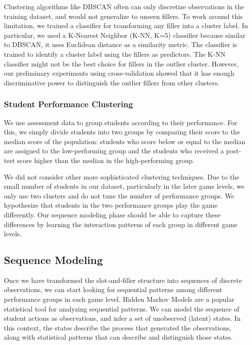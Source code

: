 \documentclass{sigchi}
\begin{document}
	Clustering algorithms like DBSCAN often can only discretize observations in the training dataset, and would not generalize to unseen fillers.
	To work around this limitation, we trained a classifier for transforming any filler into a cluster label. 
	In particular, we used a K-Nearest Neighbor (K-NN, K=5) classifier because similar to DBSCAN, it uses Euclidean distance as a similarity metric.
	The classifier is trained to identify a cluster label using the fillers as predictors.
	The K-NN classifier might not be the best choice for fillers in the outlier cluster. 
	However, our preliminary experiments using cross-validation showed that it has enough discriminative power to distinguish the outlier fillers from other clusters.
	
	\subsubsection{Student Performance Clustering}
	\label{sec:student_disc}
	
	We use assessment data to group students according to their performance.
	For this, we simply  divide students into two groups by comparing their score to the median score of the population: students who score below or equal to the median are assigned to the low-performing group and the students who received a post-test score higher than the median in the high-performing group.
	 
	We did not consider other more sophisticated clustering techniques.
	Due to the small number of students in our dataset, particularly in the later game levels, we only
	use two clusters and do not tune the number of performance groups.
	We hypothesize that students in the two performance groups play the game differently. 
	Our sequence modeling phase should be able to capture these differences by learning the interaction patterns of each group in different game levels.

	
	\subsection{Sequence Modeling}
	Once we have transformed the slot-and-filler structure into sequences of discrete observations, we can start looking for sequential patterns among different performance groups in each game level.
	Hidden Markov Models are a popular statistical tool for analyzing sequential patterns.
	We can model the sequence of student actions as observations,
	and infer a set of unobserved (latent) states.
	In this context, the states describe the process that generated the observations, along with statistical patterns that can describe and distinguish those states.
\end{document}
